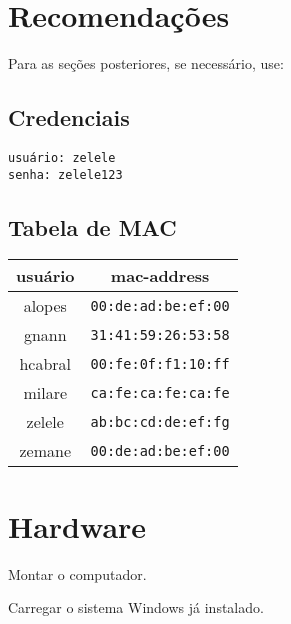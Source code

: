 


\siheader
\section*{Recomendações}
Para as seções posteriores, se necessário, use:

\subsection*{Credenciais}
\begin{verbatim}
usuário: zelele
senha: zelele123
\end{verbatim}

\subsection*{Tabela de MAC}
\begin{table}[h!]
\begin{tabular}{ |c|c| }
    \hline
    usuário & mac-address \\ \hline
    alopes & \verb+00:de:ad:be:ef:00+ \\ \hline
    gnann & \verb+31:41:59:26:53:58+ \\ \hline
    hcabral & \verb+00:fe:0f:f1:10:ff+ \\ \hline
    milare & \verb+ca:fe:ca:fe:ca:fe+ \\ \hline
    zelele & \verb+ab:bc:cd:de:ef:fg+ \\ \hline
    zemane & \verb+00:de:ad:be:ef:00+ \\ \hline
\end{tabular}
\end{table}

\section*{Hardware}
\begin{questions}

\question
Montar o computador.


\question
Carregar o sistema Windows já instalado.

\end{questions}
\newpage


